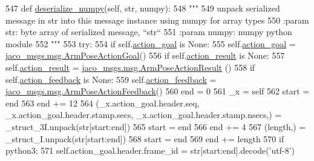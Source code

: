\begin{DoxyCode}
547   \textcolor{keyword}{def }\hyperlink{classjaco__msgs_1_1msg_1_1__ArmPoseAction_1_1ArmPoseAction_aea2da209af900a77da7ec05d4594421e}{deserialize\_numpy}(self, str, numpy):
548     \textcolor{stringliteral}{"""}
549 \textcolor{stringliteral}{    unpack serialized message in str into this message instance using numpy for array types}
550 \textcolor{stringliteral}{    :param str: byte array of serialized message, ``str``}
551 \textcolor{stringliteral}{    :param numpy: numpy python module}
552 \textcolor{stringliteral}{    """}
553     \textcolor{keywordflow}{try}:
554       \textcolor{keywordflow}{if} self.\hyperlink{classjaco__msgs_1_1msg_1_1__ArmPoseAction_1_1ArmPoseAction_ababc0bb07c8926c3e8d55dfd2ddacdf4}{action\_goal} \textcolor{keywordflow}{is} \textcolor{keywordtype}{None}:
555         self.\hyperlink{classjaco__msgs_1_1msg_1_1__ArmPoseAction_1_1ArmPoseAction_ababc0bb07c8926c3e8d55dfd2ddacdf4}{action\_goal} = \hyperlink{classjaco__msgs_1_1msg_1_1__ArmPoseActionGoal_1_1ArmPoseActionGoal}{jaco\_msgs.msg.ArmPoseActionGoal}()
556       \textcolor{keywordflow}{if} self.\hyperlink{classjaco__msgs_1_1msg_1_1__ArmPoseAction_1_1ArmPoseAction_a15c3aa8e8baead8d23478de23af61ca0}{action\_result} \textcolor{keywordflow}{is} \textcolor{keywordtype}{None}:
557         self.\hyperlink{classjaco__msgs_1_1msg_1_1__ArmPoseAction_1_1ArmPoseAction_a15c3aa8e8baead8d23478de23af61ca0}{action\_result} = \hyperlink{classjaco__msgs_1_1msg_1_1__ArmPoseActionResult_1_1ArmPoseActionResult}{jaco\_msgs.msg.ArmPoseActionResult}
      ()
558       \textcolor{keywordflow}{if} self.\hyperlink{classjaco__msgs_1_1msg_1_1__ArmPoseAction_1_1ArmPoseAction_a4e1fca881430990eb71fe999027640aa}{action\_feedback} \textcolor{keywordflow}{is} \textcolor{keywordtype}{None}:
559         self.\hyperlink{classjaco__msgs_1_1msg_1_1__ArmPoseAction_1_1ArmPoseAction_a4e1fca881430990eb71fe999027640aa}{action\_feedback} = 
      \hyperlink{classjaco__msgs_1_1msg_1_1__ArmPoseActionFeedback_1_1ArmPoseActionFeedback}{jaco\_msgs.msg.ArmPoseActionFeedback}()
560       end = 0
561       \_x = self
562       start = end
563       end += 12
564       (\_x.action\_goal.header.seq, \_x.action\_goal.header.stamp.secs, \_x.action\_goal.header.stamp.nsecs,) = 
      \_struct\_3I.unpack(str[start:end])
565       start = end
566       end += 4
567       (length,) = \_struct\_I.unpack(str[start:end])
568       start = end
569       end += length
570       \textcolor{keywordflow}{if} python3:
571         self.action\_goal.header.frame\_id = str[start:end].decode(\textcolor{stringliteral}{'utf-8'})

\end{DoxyCode}
